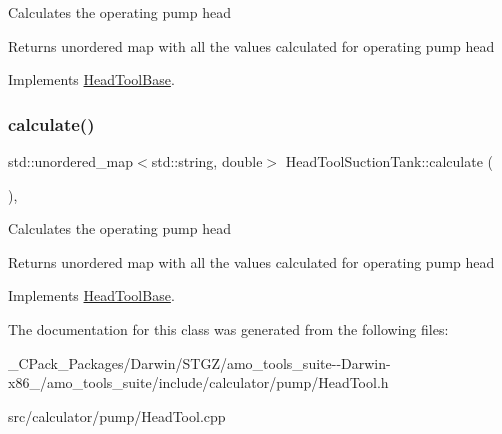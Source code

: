Calculates the operating pump head \begin{DoxyReturn}{Returns}
unordered map with all the values calculated for operating pump head 
\end{DoxyReturn}


Implements \hyperlink{class_head_tool_base_ab8df8f908827ce45dc5e769ea0e10f0b}{Head\+Tool\+Base}.

\mbox{\label{class_head_tool_suction_tank_a7e4a6931caa7c9be43992aecdfb80bec}} 
\subsubsection{\texorpdfstring{calculate()}{calculate()}\hspace{0.1cm}{\footnotesize\ttfamily [3/3]}}
{\footnotesize\ttfamily std\+::unordered\+\_\+map$<$std\+::string, double$>$ Head\+Tool\+Suction\+Tank\+::calculate (\begin{DoxyParamCaption}{ }\end{DoxyParamCaption})\hspace{0.3cm}{\ttfamily [override]}, {\ttfamily [virtual]}}

Calculates the operating pump head \begin{DoxyReturn}{Returns}
unordered map with all the values calculated for operating pump head 
\end{DoxyReturn}


Implements \hyperlink{class_head_tool_base_ab8df8f908827ce45dc5e769ea0e10f0b}{Head\+Tool\+Base}.



The documentation for this class was generated from the following files\+:\begin{DoxyCompactItemize}
\item 
\+\_\+\+C\+Pack\+\_\+\+Packages/\+Darwin/\+S\+T\+G\+Z/amo\+\_\+tools\+\_\+suite-\/-\/\+Darwin-\/x86\+\_/amo\+\_\+tools\+\_\+suite/include/calculator/pump/Head\+Tool.\+h\item 
src/calculator/pump/Head\+Tool.\+cpp\end{DoxyCompactItemize}
